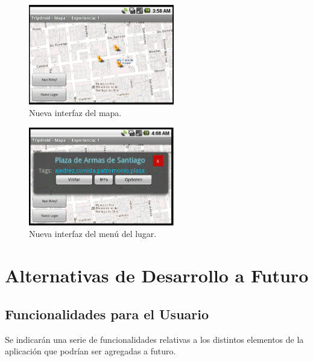 \documentclass[10pt,letterpaper]{article}
\begin{document}
\begin{figure}[h]
\begin{center}
\includegraphics[width=180pt]{./imgs/TripdroidMapa2.png}
\caption{Nueva interfaz del mapa.}
\end{center}
\end{figure}

\begin{figure}[h]
\begin{center}
\includegraphics[width=180pt]{./imgs/TripdroidLugar.png}
\caption{Nueva interfaz del menú del lugar.}
\end{center}
\end{figure}

\newpage
\section{Alternativas de Desarrollo a Futuro}

\subsection{Funcionalidades para el Usuario}

Se indicarán una serie de funcionalidades relativas a los distintos elementos de la aplicación que podrían ser agregadas a futuro.\\
\end{document}
